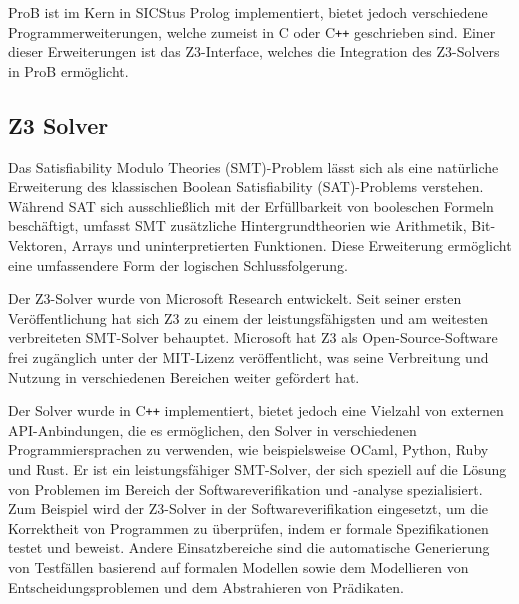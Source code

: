 ProB ist im Kern in SICStus Prolog \cite{carlsson1988sicstus} implementiert, bietet jedoch verschiedene Programmerweiterungen, welche zumeist in C oder C\texttt{++} geschrieben sind.
Einer dieser Erweiterungen ist das Z3-Interface, welches die Integration des Z3-Solvers in ProB ermöglicht.

\subsection{Z3 Solver}

Das Satisfiability Modulo Theories (SMT)-Problem lässt sich als eine natürliche Erweiterung des klassischen Boolean Satisfiability (SAT)-Problems verstehen.
Während SAT sich ausschließlich mit der Erfüllbarkeit von booleschen Formeln beschäftigt,
umfasst SMT zusätzliche Hintergrundtheorien wie Arithmetik, Bit-Vektoren, Arrays und uninterpretierten Funktionen.
Diese Erweiterung ermöglicht eine umfassendere Form der logischen Schlussfolgerung.

Der Z3-Solver \cite{10.1007/978-3-540-78800-3_24} wurde von Microsoft Research entwickelt.
Seit seiner ersten Veröffentlichung hat sich Z3 zu einem der leistungsfähigsten und am weitesten verbreiteten SMT-Solver behauptet.
Microsoft hat Z3 als Open-Source-Software frei zugänglich unter der MIT-Lizenz veröffentlicht,
was seine Verbreitung und Nutzung in verschiedenen Bereichen weiter gefördert hat.

Der Solver wurde in C\texttt{++} implementiert, bietet jedoch eine Vielzahl von externen API-Anbindungen, die es ermöglichen, den Solver in verschiedenen Programmiersprachen zu verwenden,
wie beispielsweise OCaml, Python, Ruby und Rust.
Er ist ein leistungsfähiger SMT-Solver, der sich speziell auf die Lösung von Problemen im Bereich der Softwareverifikation und -analyse spezialisiert.
Zum Beispiel wird der Z3-Solver in der Softwareverifikation eingesetzt, um die Korrektheit von Programmen zu überprüfen, indem er formale Spezifikationen testet und beweist.
Andere Einsatzbereiche sind die automatische Generierung von Testfällen basierend auf formalen Modellen sowie dem Modellieren von Entscheidungsproblemen und dem Abstrahieren von Prädikaten.


